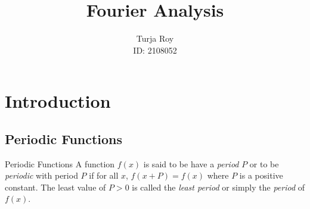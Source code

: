 \documentclass[12pt]{article}
\title{
    \textbf{Fourier Analysis}
}
\author{
    Turja Roy\\
    ID: 2108052
}
\date{}
\begin{document}
\maketitle
\tableofcontents
\newpage


\section{Introduction}

\subsection{Periodic Functions}
\begin{definition}{Periodic Functions}{}
    A function $f(x)$ is said to be have a \textit{period} $P$ or to be \textit{periodic} with period $P$ if for all $x$, $f(x+P) = f(x)$ where $P$ is a positive constant. The least value of $P>0$ is called the \textit{least period} or simply the \textit{period} of $f(x)$.
\end{definition}
\end{document}
